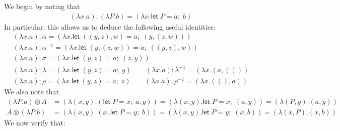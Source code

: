 \documentclass[acmsmall,screen,review]{acmart}
\newcommand{\ms}[1]{\ensuremath{\mathsf{#1}}}
\newcommand{\letexpr}[3]{\ensuremath{\ms{let}\;#1 = #2;\;#3}}
\begin{document}
We begin by noting that
\begin{gather*}
  (\lambda x . a) ; (\lambda P . b) = (\lambda x . \letexpr{P}{a}{b})
\end{gather*}
In particular, this allows us to deduce the following useful identities:
\begin{gather*}
  (\lambda x. a) ; \alpha = (\lambda x. \letexpr{((y, z), w)}{a}{(y, (z, w))}) \\
  (\lambda x. a) ; \alpha^{-1} = (\lambda x. \letexpr{(y, (z, w))}{a}{((y, z), w)}) \\
  (\lambda x. a) ; \sigma = (\lambda x. \letexpr{(y, z)}{a}{(z, y)}) \\
  (\lambda x. a) ; \lambda = (\lambda x. \letexpr{(y, z)}{a}{y}) \qquad
  (\lambda x. a) ; \lambda^{-1} = (\lambda x. (a, ())) \\
  (\lambda x. a) ; \rho = (\lambda x. \letexpr{(y, z)}{a}{z}) \qquad
  (\lambda x. a) ; \rho^{-1} = (\lambda x. ((), a))
\end{gather*}
We also note that
\begin{align*}
  (\lambda P . a) \otimes A 
    &= (\lambda (x, y) . (\letexpr{P}{x}{a}, y))
    = (\lambda (x, y) . \letexpr{P}{x}{(a, y)})
    = (\lambda (P, y) . (a, y)) \\
  A \otimes (\lambda P . b)
    &= (\lambda (x, y) . (x, \letexpr{P}{y}{b}))
    = (\lambda (x, y) . \letexpr{P}{y}{(x, b)})
    = (\lambda (x, P) . (x, b))
\end{align*}
We now verify that:
\end{document}
